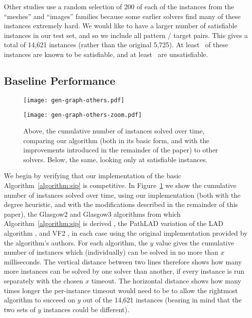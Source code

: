 \documentclass[a4paper,UKenglish]{lipics-v2018}
\newcommand{\figureref}[1]{Figure~\ref{#1}}
\newcommand{\algorithmref}[1]{Algorithm~\ref{#1}}
\begin{document}
Other studies use a random selection of 200 of each of the instances from the ``meshes'' and
``images'' families because some earlier solvers find many of these instances extremely hard. We
would like to have a larger number of satisfiable instances in our test set, and so we include all
pattern / target pairs. This gives a total of 14,621 instances (rather than the original 5,725). At
least \unskip\ of these instances are known to be satisfiable, and at least
\unskip\ are unsatisfiable.

\subsection{Baseline Performance}

\begin{figure}[tb]
    \centering
    \texttt{[image: gen-graph-others.pdf]}

    \bigskip

    \centering
    \texttt{[image: gen-graph-others-zoom.pdf]}

    \caption{Above, the cumulative number of instances solved over time, comparing our algorithm
    (both in its basic form, and with the improvements introduced in the remainder of the paper) to
    other solvers. Below, the same, looking only at satisfiable instances.}
    \label{figure:others}
\end{figure}

We begin by verifying that our implementation of the basic \algorithmref{algorithm:sip} is competitive. In
\figureref{figure:others} we show the cumulative number of instances solved over time, using our
implementation (both with the degree heuristic, and with the modifications described in the
remainder of this paper), the Glasgow2 and Glasgow3 algorithms from which \algorithmref{algorithm:sip} is derived
\cite{DBLP:conf/cp/McCreeshP15,DBLP:conf/lion/KotthoffMS16}, the PathLAD variation of the LAD
algorithm \cite{DBLP:journals/ai/Solnon10,DBLP:conf/lion/KotthoffMS16}, and VF2
\cite{DBLP:journals/pami/CordellaFSV04}, in each case using the original implementation provided
by the algorithm's authors. For each algorithm, the $y$ value
gives the cumulative number of instances which (individually) can be solved in no more than $x$
milliseconds.  The vertical distance between two lines therefore shows how many more instances can
be solved by one solver than another, if every instance is run separately with the chosen $x$
timeout. The horizontal distance shows how many times longer the per-instance timeout would need to
be to allow the rightmost algorithm to succeed on $y$ out of the 14,621 instances (bearing in mind
that the two sets of $y$ instances could be different).
\end{document}
